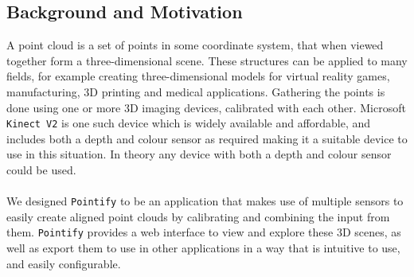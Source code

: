 \documentclass{article}
\begin{document}
\subsection{Background and Motivation}
A point cloud is a set of points in some coordinate system, that when viewed together form a three-dimensional scene. These structures can be applied to many fields, for example creating three-dimensional models for virtual reality games, manufacturing, 3D printing and medical applications. Gathering the points is done using one or more 3D imaging devices, calibrated with each other. Microsoft \texttt{Kinect V2} is one such device which is widely available and affordable, and includes both a depth and colour sensor as required making it a suitable device to use in this situation. In theory any device with both a depth and colour sensor could be used.
\\\\
We designed \texttt{Pointify} to be an application that makes use of multiple sensors to easily create aligned point clouds by calibrating and combining the input from them. \texttt{Pointify} provides a web interface to view and explore these 3D scenes, as well as export them to use in other applications in a way that is intuitive to use, and easily configurable.
\end{document}

